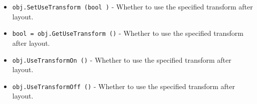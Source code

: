 \begin{itemize}
\item  \verb|obj.SetUseTransform (bool )| -  Whether to use the specified transform after layout.

\item  \verb|bool = obj.GetUseTransform ()| -  Whether to use the specified transform after layout.

\item  \verb|obj.UseTransformOn ()| -  Whether to use the specified transform after layout.

\item  \verb|obj.UseTransformOff ()| -  Whether to use the specified transform after layout.

\end{itemize}
